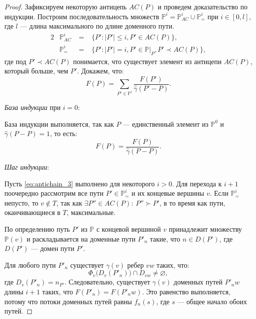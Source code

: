 \documentclass[../thesis.tex]{subfiles}
\begin{document}
\begin{proof}
Зафиксируем некоторую антицепь $AC(P)$ и проведем доказательство по индукции.
Построим последовательность множеств $\mathbb{P}^i =$\linebreak$\mathbb{P}^i_{AC}\cup \mathbb{P}^i_{=}$ при $i\in [0,l]$, где $l$ --- длина максимального по длине доменного пути.
\begin{alignat}{2}
    &\mathbb{P}^i_{AC} &\;=\;& \{P' : |P'|\leqslant i, P'\in AC(P)\}, \\
    &\mathbb{P}^i_{=}  &\;=\;& \{P' : |P'|  =  i, P'\in \mathbb{P}|_P, P'\prec AC(P)\},
\end{alignat}
где под $P'\prec AC(P)$ понимается, что существует элемент из антицепи $AC(P)$, который больше, чем $P'$.
Докажем, что:
\begin{equation} \label{eq:antichain_3}
    F(P) = \sum_{P'\in \mathbb{P}^l}{\frac{F(P')}{\hat{\gamma}(P'-P)}}.
\end{equation}

\textit{База индукции} при $i=0$:

База индукции выполняется, так как $P$ --- единственный элемент из $\mathbb{P}^0$ и $\hat{\gamma}(P-P)=1$, то есть:
\begin{equation}
    F(P) = \frac{F(P)}{\hat{\gamma}(P-P)}.
\end{equation}

\textit{Шаг индукции}:

Пусть \eqref{eq:antichain_3} выполнено для некоторого $i>0$.
Для перехода к $i+1$ поочередно рассмотрим все пути $P'\in \mathbb{P}^i_{=}$ и их концевые вершины $v$.
Если $\mathbb{P}^i_{=}$ непусто, то $v\notin T$, так как $\exists P''\in AC(P):\ P''\succ P'$, в то время как пути, оканчивающиеся в $T$, максимальные.

По определению путь $P'$ из $\mathbb{P}$ с концевой вершиной $v$ принадлежит множеству $\mathbb{P}(v)$ и раскладывается на доменные пути $P'_n$ такие, что $n\in D(P')$, где $D(P')$ --- домен пути $P'$.

Для любого пути $P'_n$ существует $\gamma(v)$ ребер $vw$ таких, что:
\begin{equation}
    \Phi_v\big(D_v(P'_n)\big)\cap D_{vw}\neq \varnothing,
\end{equation}
где $D_v(P'_n) = n_{P'}$.
Следовательно, существует $\gamma(v)$ доменных путей $P'_n w$ длины $i+1$ таких, что $F(P'_n)=F(P'_n w)$.
Это равенство выполняется, потому что потоки доменных путей равны $f_n(s)$, где $s$ --- общее начало обоих путей.


\end{proof}
\end{document}
